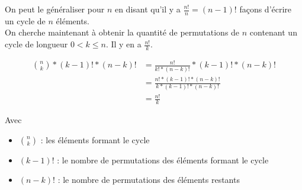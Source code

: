 	On peut le généraliser pour $n$ en disant qu'il y a $\frac{n!}{n} = (n-1)!$ façons d'écrire un cycle de $n$ éléments. \\

	On cherche maintenant à obtenir la quantité de permutations de $n$ contenant un cycle de longueur $ 0 < k \leq n$.
	Il y en a $\frac{n!}{k}$.

	\begin{align*}
		\binom{n}{k} * (k - 1)! * (n - k)! & = \frac{n!}{k! * (n - k)!} * (k - 1)! * (n - k)!           \\
		                                   & = \frac{n! * (k - 1)! * (n - k)!}{k * (k - 1)! * (n - k)!} \\
		                                   & = \frac{n!}{k}
	\end{align*}

	Avec
	\begin{itemize}
		\item $\binom{n}{k}$ : les éléments formant le cycle
		\item $(k - 1)!$ : le nombre de permutations des éléments formant le cycle
		\item $(n - k)!$ : le nombre de permutations des éléments restants
	\end{itemize}
